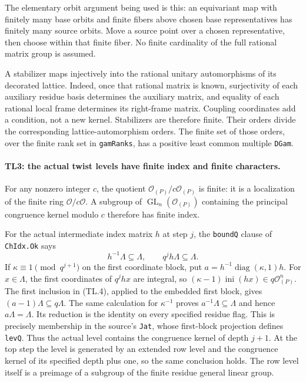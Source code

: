 \documentclass[11pt,a4paper]{article}
\numberwithin{equation}{section}
\theoremstyle{remark}\newtheorem{remark}[theorem]{Remark}
\begin{document}
The elementary orbit argument being used is this: an equivariant
map with finitely many base orbits and finite fibers above chosen
base representatives has finitely many source orbits. Move a source
point over a chosen representative, then choose within that finite
fiber. No finite cardinality of the full rational matrix group is
assumed.

A stabilizer maps injectively into the rational unitary automorphisms
of its decorated lattice. Indeed, once that rational matrix is known,
surjectivity of each auxiliary residue basis determines the auxiliary
matrix, and equality of each rational local frame determines its
right-frame matrix. Coupling coordinates add a condition, not a new
kernel. Stabilizers are therefore finite. Their orders divide the
corresponding lattice-automorphism orders. The finite set of those
orders, over the finite rank set in \texttt{gamRanks}, has a positive
least common multiple \texttt{DGam}.

\paragraph{TL3: the actual twist levels have finite index and finite
characters.}
For any nonzero integer $c$, the quotient
$\mathcal O_{(P)}/c\mathcal O_{(P)}$ is finite: it is a localization
of the finite ring $\mathcal O/c\mathcal O$. A subgroup of
$\operatorname{GL}_n(\mathcal O_{(P)})$ containing the principal
congruence kernel modulo $c$ therefore has finite index.

For the actual intermediate index matrix $h$ at step $j$, the
\texttt{boundQ} clause of \texttt{ChIdx.Ok} says
\[
 h^{-1}\Lambda\subseteq\Lambda,
 \qquad q^j h\Lambda\subseteq\Lambda.             \tag{TL.4}
\]
If $\kappa\equiv1\pmod{q^{j+1}}$ on the first coordinate block,
put $a=h^{-1}\operatorname{diag}(\kappa,1)h$. For $x\in\Lambda$,
the first coordinates of $q^jh x$ are integral, so
$(\kappa-1)\operatorname{ini}(h x)\in q\mathcal O_{(P)}^n$.
The first inclusion in (TL.4), applied to the embedded first block,
gives $(a-1)\Lambda\subseteq q\Lambda$. The same calculation for
$\kappa^{-1}$ proves $a^{-1}\Lambda\subseteq\Lambda$ and hence
$a\Lambda=\Lambda$. Its reduction is the identity on every
specified residue flag. This is precisely membership in the source's
\texttt{Jat}, whose first-block projection defines \texttt{levQ}.
Thus the actual level contains the congruence kernel of depth $j+1$.
At the top step the level is generated by an extended row level and
the congruence kernel of its specified depth plus one, so the same
conclusion holds. The row level itself is a preimage of a subgroup
of the finite residue general linear group.
\end{document}
